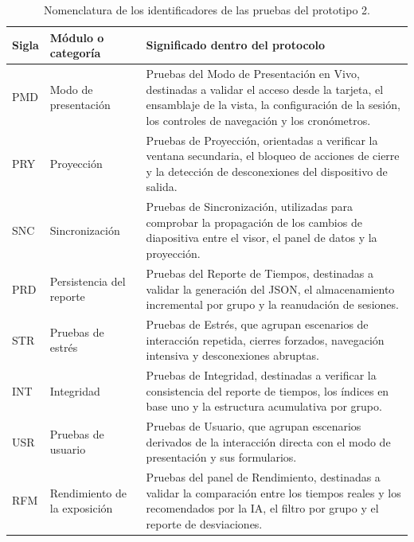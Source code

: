 \documentclass[12pt,letterpaper]{article}
\begin{document}
\begin{table}[H]
    \centering
    \renewcommand{\arraystretch}{1.2}
    \begin{tabularx}{\textwidth}{|>{\centering\arraybackslash}p{1.5cm}|p{4.6cm}|X|}
        \hline
        \textbf{Sigla} & \textbf{Módulo o categoría} & \textbf{Significado dentro del protocolo} \\
        \hline
        PMD & Modo de presentación & Pruebas del Modo de Presentación en Vivo, destinadas a validar el acceso desde la tarjeta, el ensamblaje de la vista, la configuración de la sesión, los controles de navegación y los cronómetros. \\
        \hline
        PRY & Proyección & Pruebas de Proyección, orientadas a verificar la ventana secundaria, el bloqueo de acciones de cierre y la detección de desconexiones del dispositivo de salida. \\
        \hline
        SNC & Sincronización & Pruebas de Sincronización, utilizadas para comprobar la propagación de los cambios de diapositiva entre el visor, el panel de datos y la proyección. \\
        \hline
        PRD & Persistencia del reporte & Pruebas del Reporte de Tiempos, destinadas a validar la generación del JSON, el almacenamiento incremental por grupo y la reanudación de sesiones. \\
        \hline
        STR & Pruebas de estrés & Pruebas de Estrés, que agrupan escenarios de interacción repetida, cierres forzados, navegación intensiva y desconexiones abruptas. \\
        \hline
        INT & Integridad & Pruebas de Integridad, destinadas a verificar la consistencia del reporte de tiempos, los índices en base uno y la estructura acumulativa por grupo. \\
        \hline
        USR & Pruebas de usuario & Pruebas de Usuario, que agrupan escenarios derivados de la interacción directa con el modo de presentación y sus formularios. \\
        \hline
        RFM & Rendimiento de la exposición & Pruebas del panel de Rendimiento, destinadas a validar la comparación entre los tiempos reales y los recomendados por la IA, el filtro por grupo y el reporte de desviaciones. \\
        \hline
    \end{tabularx}
    \caption{Nomenclatura de los identificadores de las pruebas del prototipo 2.}
    \label{tab:nomenclatura-pruebas-prototipo-2}
\end{table}
\end{document}
